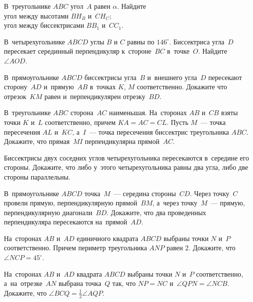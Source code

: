 


\begin{problems}

\item
В~треугольнике $ABC$ угол~$A$ равен $\alpha$.
Найдите
\\
\subproblem угол между высотами $B H_B$ и~$C H_C$;
\\
\subproblem угол между биссектрисами $B B_1$ и~$C C_1$.

\item
В~четырехугольнике $ABCD$ углы $B$ и $C$ равны по $146^{\circ}$.
Биссектриса угла~$D$ пересекает серединный перпендикуляр к~стороне~$BC$
в~точке~$O$.
Найдите $\angle AOD$.

\item
В~прямоугольнике $ABCD$ биссектрисы угла~$B$ и~внешнего угла~$D$ пересекают
сторону~$AD$ и~прямую~$AB$ в~точках $K$, $M$ соответственно.
Докажите что отрезок~$KM$ равен и~перпендикулярен отрезку~$BD$.


\item
В~треугольнике $ABC$ сторона~$AC$ наименьшая.
На~сторонах $AB$ и~$CB$ взяты точки $K$ и~$L$ соответственно, причем
$KA = AC = CL$.
Пусть $M$~--- точка пересечения $AL$ и~$KC$, а~$I$~--- точка пересечения
биссектрис треугольника $ABC$.
Докажите, что прямая~$MI$ перпендикулярна прямой~$AC$.

\item
Биссектрисы двух соседних углов четырехугольника пересекаются в~середине его
стороны.
Докажите, что либо у~этого четырехугольника равны два угла, либо две стороны
параллельны.

\item
В~прямоугольнике $ABCD$ точка~$M$~--- середина стороны~$CD$.
Через точку~$C$ провели прямую, перпендикулярную прямой~$BM$, а~через
точку~$M$~--- прямую, перпендикулярную диагонали~$BD$.
Докажите, что два проведенных перпендикуляра пересекаются на~прямой~$AD$.

\item
На~сторонах $AB$ и~$AD$ единичного квадрата $ABCD$ выбраны точки $N$ и~$P$
соответственно.
Причем периметр треугольника $ANP$ равен $2$.
Докажите, что $\angle NCP = 45^{\circ}$.

\item
На~сторонах $AB$ и~$AD$ квадрата $ABCD$ выбраны точки $N$ и~$P$ соответственно,
а~на~отрезке~$AN$ выбрана точка~$Q$ так, что $NP = NC$
и~$\angle QPN = \angle NCB$.
Докажите, что $\angle BCQ = \frac{1}{2} \angle AQP$.

\end{problems}

